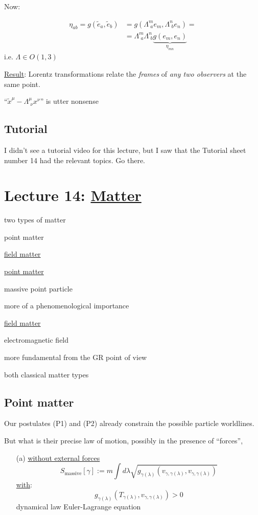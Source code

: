 \documentclass[10pt, twoside]{amsart}
\begin{document}
\begin{multicols*}{2}
Now:

\[
\begin{aligned}
  \eta_{ab} = g(\widetilde{e}_a, \widetilde{e}_b) & = g(\Lambda^m_{ \, \, a}e_m, \Lambda^n_{ \, \, b} e_n ) = \\
  & = \Lambda^m_{ \, \, a} \Lambda^n_{ \, \, b} \underbrace{g(e_m,e_n)}_{ \eta_{mn}}
\end{aligned}
\]
i.e. $\Lambda \in O(1,3)$

\underline{Result}: Lorentz transformations relate the \emph{frames} of \emph{any two observers} at the same point.

``$\widetilde{x}^{\mu} - \Lambda^{\mu}_{ \, \, \nu} x^{\nu}$'' is utter nonsense

\subsection*{Tutorial}

I didn't see a tutorial video for this lecture, but I saw that the Tutorial sheet number 14 had the relevant topics.  Go there.

\section{Lecture 14: \underline{Matter}}

two types of matter

point matter

\underline{field matter}

\underline{point matter}

massive point particle 

more of a phenomenological importance

\underline{field matter}
 
electromagnetic field

more fundamental from the GR point of view


both classical matter types


\subsection{Point matter}

Our postulates (P1) and (P2) already constrain the possible particle worldlines.  

But what is their precise law of motion, possibly in the presence of ``forces'',

\begin{enumerate}
\item[(a)] \underline{without external forces}
\[
S_{\text{massive}}[\gamma] := m \int d\lambda \sqrt{ g_{\gamma(\lambda)}( v_{\gamma,\gamma(\lambda)} , v_{\gamma,\gamma(\lambda) } ) }
\]
\underline{with}:
\[
g_{\gamma(\lambda)}(T_{\gamma(\lambda)}, v_{\gamma, \gamma(\lambda) } ) > 0 
\]
dynamical law Euler-Lagrange equation


\end{enumerate}
\end{multicols*}
\end{document}
